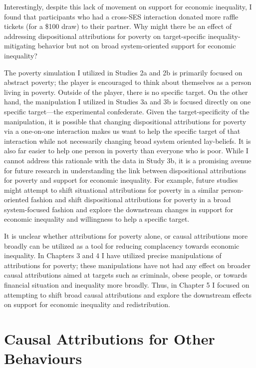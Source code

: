\documentclass{sfuthesis}
\begin{document}
Interestingly, despite this lack of movement on support for economic inequality, I found that participants who had a cross-SES interaction donated more raffle tickets (for a \$100 draw) to their partner. Why might there be an effect of addressing dispositional attributions for poverty on target-specific inequality-mitigating behavior but not on broad system-oriented support for economic inequality?

The poverty simulation I utilized in Studies 2a and 2b is primarily focused on abstract poverty; the player is encouraged to think about themselves as a person living in poverty. Outside of the player, there is no specific target. On the other hand, the manipulation I utilized in Studies 3a and 3b is focused directly on one specific target—the experimental confederate. Given the target-specificity of the manipulation, it is possible that changing dispositional attributions for poverty via a one-on-one interaction makes us want to help the specific target of that interaction while not necessarily changing broad system oriented lay-beliefs. It is also far easier to help one person in poverty than everyone who is poor. While I cannot address this rationale with the data in Study 3b, it is a promising avenue for future research in understanding the link between dispositional attributions for poverty and support for economic inequality. For example, future studies might attempt to shift situational attributions for poverty in a similar person-oriented fashion and shift dispositional attributions for poverty in a broad system-focused fashion and explore the downstream changes in support for economic inequality and willingness to help a specific target.

It is unclear whether attributions for poverty alone, or causal attributions more broadly can be utilized as a tool for reducing complacency towards economic inequality. In Chapters 3 and 4 I have utilized precise manipulations of attributions for poverty; these manipulations have not had any effect on broader causal attributions aimed at targets such as criminals, obese people, or towards financial situation and inequality more broadly. Thus, in Chapter 5 I focused on attempting to shift broad causal attributions and explore the downstream effects on support for economic inequality and redistribution.

\chapter{Causal Attributions for Other Behaviours}
\end{document}
